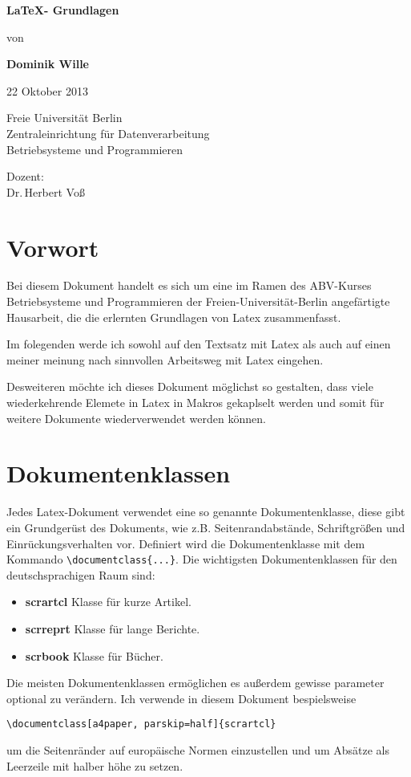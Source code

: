\documentclass[a4paper, parskip=half]{scrartcl}
\newcommand{\myImage}[2]{
  \begin{center}
    \begin{minipage}{\linewidth}
      \centering
      \makebox[0cm]{\texttt{[image: \#1]}}
    \end{minipage}
    \ifthenelse{ \equal{#2}{}} {
      
    } {
    \captionof{figure}{#2}
    }
  \end{center}
}
\newcommand\myTitle{\LaTeX - Grundlagen}
\newcommand\myAuthor{Dominik Wille}
\newcommand\myDate{22 Oktober 2013}
\begin{document}
\begin{titlepage}
  \begin{center}
    \vspace{5cm}
    \huge\bfseries
    \myTitle
    \vspace{1cm}

    \large\normalfont von

    \bigskip
    \textbf{\myAuthor}

    \myDate

    \vspace{2cm}
    \myImage{images/typesetting}{} %
  \end{center}
  \vfill
  \enlargethispage{2cm}
  \parbox[t]{0.45\textwidth}{%
    Freie Universität Berlin\\
    Zentraleinrichtung für Datenverarbeitung\\
    Betriebsysteme und Programmieren
  }
  \parbox[t]{0.45\textwidth}{\raggedleft%
    Dozent: \\
    Dr.\,Herbert Voß\\
  }
\end{titlepage}
\section{Vorwort}
Bei diesem Dokument handelt es sich um eine im Ramen des ABV-Kurses Betriebsysteme und Programmieren der
Freien-Universität-Berlin angefärtigte Hausarbeit, die die erlernten Grundlagen von Latex zusammenfasst.

Im folegenden werde ich sowohl auf den Textsatz mit Latex als auch auf einen meiner meinung nach sinnvollen
Arbeitsweg mit Latex eingehen.

Desweiteren möchte ich dieses Dokument möglichst so gestalten, dass viele wiederkehrende Elemete in Latex in
Makros gekaplselt werden und somit für weitere Dokumente wiederverwendet werden können.

\section{Dokumentenklassen}
Jedes Latex-Dokument verwendet eine so genannte Dokumentenklasse, diese gibt ein Grundgerüst des Dokuments,
wie z.B. Seitenrandabstände, Schriftgrößen und Einrückungsverhalten vor. Definiert wird die Dokumentenklasse
mit dem Kommando \verb+\documentclass{...}+. Die wichtigsten Dokumentenklassen für den deutschsprachigen
Raum sind:
\begin{itemize}
\item \textbf{scrartcl} Klasse für kurze Artikel.
\item \textbf{scrreprt} Klasse für lange Berichte.
\item \textbf{scrbook} Klasse für Bücher.  
\end{itemize}
Die meisten Dokumentenklassen ermöglichen es außerdem gewisse parameter optional zu verändern. Ich verwende in
diesem Dokument bespielsweise 
\begin{verbatim}
\documentclass[a4paper, parskip=half]{scrartcl}
\end{verbatim}
um die Seitenränder auf europäische Normen einzustellen und um Absätze als Leerzeile mit halber höhe zu setzen.
\end{document}
